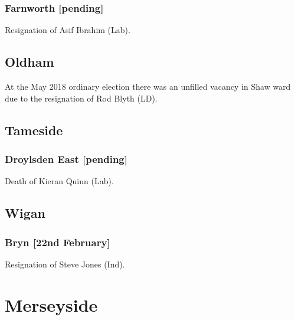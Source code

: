 \documentclass[a4paper,openany]{book}
\begin{document}
\begin{resultsiii}
\subsubsection*{Farnworth \hspace*{\fill}\nolinebreak[1]%
\enspace\hspace*{\fill}
[pending]}


Resignation of Asif Ibrahim (Lab).

\subsection*{Oldham}

At the May 2018 ordinary election there was an unfilled vacancy in Shaw ward due to the resignation of Rod Blyth (LD).

\subsection*{Tameside}

\subsubsection*{Droylsden East \hspace*{\fill}\nolinebreak[1]%
\enspace\hspace*{\fill}
[pending]}


Death of Kieran Quinn (Lab).

\subsection*{Wigan}

\subsubsection*{Bryn \hspace*{\fill}\nolinebreak[1]%
\enspace\hspace*{\fill}
[22nd February]}


Resignation of Steve Jones (Ind).

\section{Merseyside}


\end{resultsiii}
\end{document}
